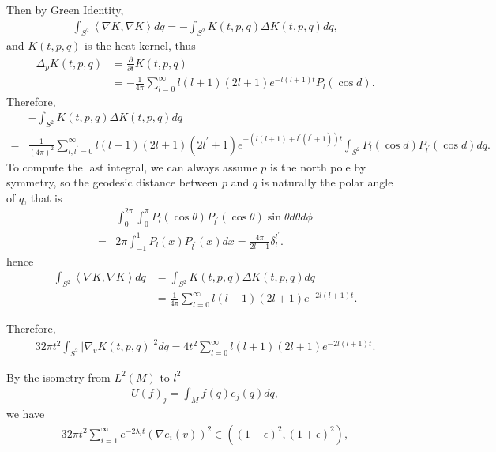 Then by Green Identity,
\begin{align}
\int_{S^2} \left\langle \nabla K, \nabla K\right\rangle dq = -\int_{S^2} K(t,p,q) \Delta K(t,p,q) dq,
\end{align}
and $K(t,p,q)$ is the heat kernel, thus
\begin{align}
	\Delta_p K(t,p,q) &= \frac{\partial}{\partial t} K(t,p,q)\\
	&=-\frac{1}{4\pi}\sum_{l=0}^{\infty} l(l+1)(2l+1)e^{-l(l+1) t} P_l(\cos d).
\end{align}
Therefore, 
\begin{align}
&-\int_{S^2} K(t,p,q) \Delta K(t,p,q) dq \\
=&\frac{1}{(4\pi)^2} \sum_{l,l^\prime=0}^\infty l(l+1)(2l+1)(2l^\prime+1)e^{-\left(l(l+1)+ l^\prime(l^\prime+1)\right) t} \int_{S^2} P_l(\cos d) P_{l^\prime}(\cos d) dq.
\end{align}
To compute the last integral, we can always assume $p$ is the north pole by symmetry, so the geodesic distance between $p$ and $q$ is naturally the polar angle of $q$, that is
\begin{align}
&\int_0^{2\pi} \int_0^\pi P_l(\cos \theta) P_{l^\prime}(\cos \theta) \sin \theta d\theta d\phi \\
=&2\pi \int_{-1}^1 P_l(x) P_{l^\prime}(x) dx = \frac{4\pi}{ 2l+1} \delta_l^{l^\prime}.
\end{align}
hence
\begin{align}
\int_{S^2} \left\langle \nabla K, \nabla K\right\rangle dq &= \int_{S^2} K(t,p,q) \Delta K(t,p,q) dq \\
&= \frac{1}{4\pi} \sum_{l=0}^\infty l(l+1)(2l+1)e^{-2l(l+1)t}.
\end{align}

Therefore,
\begin{align}
	32\pi t^2 \int_{S^2} |\nabla_v K(t,p,q)|^2 dq = 4t^2\sum_{l=0}^\infty l(l+1)(2l+1)e^{-2l(l+1)t}.
\end{align}


By the isometry from $L^2(M)$ to $l^2$
\begin{align}
	U(f)_j=\int_M f(q) e_j(q) dq,
\end{align}
we have 
\begin{align}
	32\pi t^2 \sum_{i=1}^{\infty} e^{-2\lambda_i t} (\nabla e_i (v))^2  \in \left((1-\epsilon)^2,(1+\epsilon)^2\right),
\end{align}


